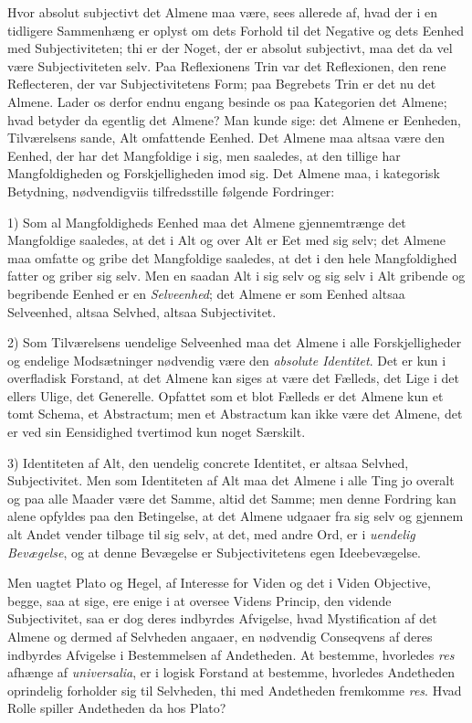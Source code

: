 \documentclass[11pt]{book}
\newcommand{\opage}[1]{\marginnote{\footnotesize\textit{[#1]}}}
\begin{document}
Hvor absolut subjectivt det Almene maa være, sees allerede af, hvad
der i en tidligere Sammenhæng er oplyst om dets Forhold til det
Negative og dets Eenhed med Subjectiviteten; thi er der Noget, der
er absolut subjectivt, maa det da vel være Subjectiviteten selv.
Paa Reflexionens Trin var det Reflexionen, den rene Reflecteren,
der var Subjectivitetens Form; paa Begrebets Trin er det nu det
Almene. Lader os derfor endnu engang besinde os paa Kategorien det
Almene; hvad betyder da egentlig det Almene? Man kunde sige: det
Almene er Eenheden, Tilværelsens sande, Alt omfattende Eenhed. Det
Almene maa altsaa være den Eenhed, der har det Mangfoldige i sig,
men saaledes, at den tillige har Mangfoldigheden og
Forskjelligheden imod sig. Det Almene maa, i kategorisk Betydning,
nødvendigviis tilfredsstille følgende Fordringer:

1) Som al Mangfoldigheds Eenhed maa det Almene gjennemtrænge det
Mangfoldige saaledes, at det i Alt og over Alt er Eet med sig selv;
det Almene maa omfatte og gribe det Mangfoldige saaledes, at det i
den hele Mangfoldighed fatter og griber sig selv. Men en saadan Alt
i sig selv og sig selv i Alt gribende og begribende Eenhed er en
\emph{Selveenhed}; det Almene er som Eenhed altsaa Selveenhed,
altsaa Selvhed, altsaa Subjectivitet.

\opage{182} \setcounter{footnote}{0}%
2) Som Tilværelsens uendelige Selveenhed maa det Almene i alle
Forskjelligheder og endelige Modsætninger nødvendig være den
\emph{absolute Identitet}. Det er kun i overfladisk Forstand, at
det Almene kan siges at være det Fælleds, det Lige i det ellers
Ulige, det Generelle. Opfattet som et blot Fælleds er det Almene
kun et tomt Schema, et Abstractum; men et Abstractum kan ikke være
det Almene, det er ved sin Eensidighed tvertimod kun noget
Særskilt.

3) Identiteten af Alt, den uendelig concrete Identitet, er altsaa
Selvhed, Subjectivitet. Men som Identiteten af Alt maa det Almene i
alle Ting jo overalt og paa alle Maader være det Samme, altid det
Samme; men denne Fordring kan alene opfyldes paa den Betingelse, at
det Almene udgaaer fra sig selv og gjennem alt Andet vender tilbage
til sig selv, at det, med andre Ord, er i \emph{uendelig
Bevægelse}, og at denne Bevægelse er Subjectivitetens egen
Ideebevægelse.

Men uagtet Plato og Hegel, af Interesse for Viden og det i Viden
Objective, begge, saa at sige, ere enige i at oversee Videns
Princip, den vidende Subjectivitet, saa er dog deres indbyrdes
Afvigelse, hvad Mystification af det Almene og dermed af Selvheden
angaaer, en nødvendig Conseqvens af deres indbyrdes Afvigelse i
Bestemmelsen af Andetheden. At bestemme, hvorledes \textit{res}
afhænge af \textit{universalia}, er i logisk Forstand at bestemme,
hvorledes Andetheden oprindelig forholder sig til Selvheden, thi
med Andetheden fremkomme \textit{res}. Hvad Rolle spiller
Andetheden da hos Plato?
\end{document}
